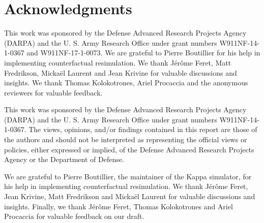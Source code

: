 \section*{Acknowledgments}

\ifshort This work was sponsored by the Defense Advanced Research
Projects Agency (DARPA) and the U. S. Army Research Office under grant
numbers W911NF-14-1-0367 and W911NF-17-1-0073.  We are grateful to
Pierre Boutillier for his help in implementing counterfactual
resimulation. We thank J\'{e}r\^{o}me Feret, Matt Fredrikson,
Micka\"{e}l Laurent and Jean Krivine for valuable discussions and
insights. We thank Thomas Kolokotrones, Ariel Procaccia and the
anonymous reviewers for valuable feedback.

\else

This work was sponsored by the Defense Advanced Research Projects
Agency (DARPA) and the U. S. Army Research Office under grant numbers
W911NF-14-1-0367.  The views, opinions, and/or findings
contained in this report are those of the authors and should not be
interpreted as representing the official views or policies, either
expressed or implied, of the Defense Advanced Research Projects Agency
or the Department of Defense. 

We are grateful to Pierre Boutillier, the maintainer of the Kappa
simulator, for his help in implementing counterfactual resimulation.
We thank J\'{e}r\^{o}me Feret, Jean Krivine, Matt Fredrikson and
Micka\"{e}l Laurent for valuable discussions and insights.  Finally,
we thank J\'{e}r\^{o}me Feret, Thomas Kolokotrones and Ariel Procaccia
for valuable feedback on our draft.
\fi
